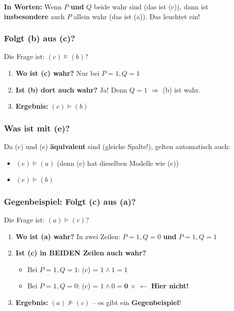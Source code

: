 \documentclass[a4paper,12pt]{article}
\begin{document}
\begin{analogie}
\textbf{In Worten:} Wenn $P$ \textbf{und} $Q$ beide wahr sind (das ist (c)), dann ist \textbf{insbesondere} auch $P$ allein wahr (das ist (a)). Das leuchtet ein!
\end{analogie}

\subsubsection*{Folgt (b) aus (c)?}

Die Frage ist: $(c) \models (b)$?

\begin{enumerate}
\item \textbf{Wo ist (c) wahr?} Nur bei $P\!=\!1, Q\!=\!1$
\item \textbf{Ist (b) dort auch wahr?} Ja! Denn $Q = 1$ $\Rightarrow$ (b) ist wahr.
\item \textbf{Ergebnis:} $(c) \models (b)$ \checkmark
\end{enumerate}

\subsubsection*{Was ist mit (e)?}

Da (c) und (e) \textbf{\"aquivalent} sind (gleiche Spalte!), gelten automatisch auch:
\begin{itemize}
\item $(e) \models (a)$ \checkmark \quad (denn (e) hat dieselben Modelle wie (c))
\item $(e) \models (b)$ \checkmark
\end{itemize}

\subsubsection*{Gegenbeispiel: Folgt (c) aus (a)?}

Die Frage ist: $(a) \models (c)$?

\begin{enumerate}
\item \textbf{Wo ist (a) wahr?} In zwei Zeilen: $P\!=\!1, Q\!=\!0$ \textbf{und} $P\!=\!1, Q\!=\!1$
\item \textbf{Ist (c) in BEIDEN Zeilen auch wahr?}
  \begin{itemize}
  \item Bei $P\!=\!1, Q\!=\!1$: (c) = $1 \wedge 1 = 1$ \checkmark
  \item Bei $P\!=\!1, Q\!=\!0$: (c) = $1 \wedge 0 = \textbf{0}$ $\boldsymbol{\times}$ $\leftarrow$ \textbf{Hier nicht!}
  \end{itemize}
\item \textbf{Ergebnis:} $(a) \not\models (c)$ -- es gibt ein \textbf{Gegenbeispiel}!
\end{enumerate}
\end{document}
